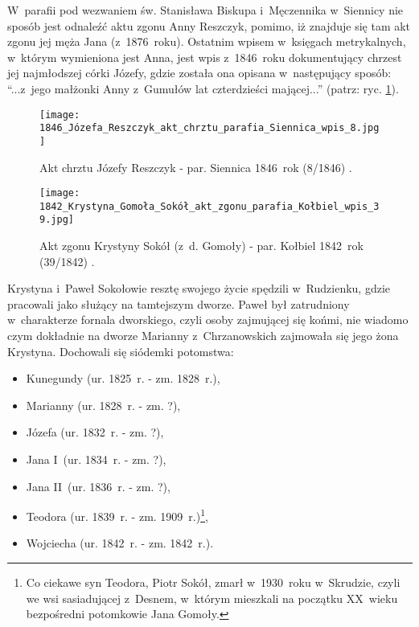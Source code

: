 W~parafii pod wezwaniem św. Stanisława Biskupa i~Męczennika w~Siennicy nie 
sposób jest odnaleźć aktu zgonu Anny Reszczyk, pomimo, iż znajduje się tam 
akt zgonu jej męża Jana (z~1876~roku). Ostatnim wpisem w~księgach 
metrykalnych, w~którym wymieniona jest Anna, jest wpis z~1846~roku 
dokumentujący chrzest jej najmłodszej córki Józefy, gdzie została ona 
opisana w~następujący sposób: \enquote{...z~jego małżonki Anny z~Gumułów lat 
czterdzieści mającej...} (patrz: ryc. \ref{fig:jreszczyk_1846}).

\begin{figure}[!ht]
    \vspace*{0.5cm}
    \centering \texttt{[image: 
        1846\_Józefa\_Reszczyk\_akt\_chrztu\_parafia\_Siennica\_wpis\_8.jpg]}
    \captionsetup{format=hang}
    \caption{Akt chrztu Józefy Reszczyk - par. Siennica 1846~rok (8/1846) 
    \cite{par_siennica}.}
    \label{fig:jreszczyk_1846}
\end{figure}

\begin{figure}[!ht]
    \vspace*{0.5cm}
    \centering \texttt{[image: 
        1842\_Krystyna\_Gomoła\_Sokół\_akt\_zgonu\_parafia\_Kołbiel\_wpis\_39.jpg]}
    \captionsetup{format=hang}
    \caption{Akt zgonu Krystyny Sokół (z~d. Gomoły) - par. Kołbiel 1842~rok 
    (39/1842) \cite{par_kolbiel1}.}
    \label{fig:kgomola_1842}
\end{figure}

Krystyna i~Paweł Sokołowie resztę swojego życie spędzili w~Rudzienku, gdzie 
pracowali jako służący na tamtejszym dworze. Paweł był zatrudniony 
w~charakterze fornala dworskiego, czyli osoby zajmującej się końmi, nie 
wiadomo czym dokładnie na dworze Marianny z~Chrzanowskich zajmowała się jego 
żona Krystyna. Dochowali się siódemki potomstwa: 

\begin{itemize}
    \item Kunegundy (ur. 1825~r. - zm. 1828~r.),
    \item Marianny (ur. 1828~r. - zm. ?),
    \item Józefa (ur. 1832~r. - zm. ?),
    \item Jana I~(ur. 1834~r. - zm. ?),
    \item Jana II~(ur. 1836~r. - zm. ?),
    \item Teodora (ur. 1839~r. - zm. 1909~r.)\footnote{Co ciekawe syn 
    Teodora, Piotr Sokół, zmarł w~1930~roku w~Skrudzie, czyli we wsi 
    sasiadującej z~Desnem, w~którym mieszkali na początku XX~wieku 
    bezpośredni potomkowie Jana Gomoły.},
    \item Wojciecha (ur. 1842~r. - zm. 1842~r.).
  \end{itemize}

